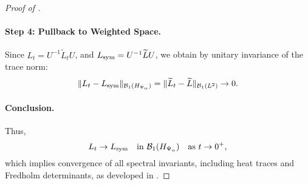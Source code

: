\begin{proof}[Proof of ]
\paragraph{Step 4: Pullback to Weighted Space.}
Since \( L_t = U^{-1} \widetilde{L}_t U \), and \( L_{\mathrm{sym}} = U^{-1} \widetilde{L} U \), we obtain by unitary invariance of the trace norm:
\[
\| L_t - L_{\mathrm{sym}} \|_{\mathcal{B}_1(H_{\Psi_\alpha})} = \| \widetilde{L}_t - \widetilde{L} \|_{\mathcal{B}_1(L^2)} \to 0.
\]

\paragraph{Conclusion.}
Thus,
\[
L_t \to L_{\mathrm{sym}} \quad \text{in } \mathcal{B}_1(H_{\Psi_\alpha}) \quad \text{as } t \to 0^+,
\]
which implies convergence of all spectral invariants, including heat traces and Fredholm determinants, as developed in .
\end{proof}
